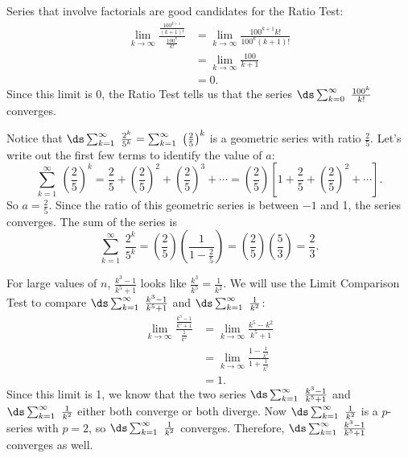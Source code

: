 \begin{activitySolution}
\item Series that involve factorials are good candidates for the Ratio Test:
\begin{align*}
\lim_{k \to \infty} \frac{\frac{100^{k+1}}{(k+1)!}}{\frac{100^k}{k!}} &= \lim_{k \to \infty} \frac{100^{k+1}k!}{100^k(k+1)!} \\
    &= \lim_{k \to \infty} \frac{100}{k+1} \\
    &= 0.
\end{align*}
Since this limit is 0, the Ratio Test tells us that the series $\ds \sum_{k=0}^{\infty} \ \frac{100^k}{k!}$ converges.

\item Notice that $\ds \sum_{k=1}^{\infty} \ \frac{2^k}{5^k} = \sum_{k=1}^{\infty} \ \left(\frac{2}{5}\right)^k$ is a geometric series with ratio $\frac{2}{5}$. Let's write out the first few terms to identify the value of $a$:
\[ \sum_{k=1}^{\infty} \ \left(\frac{2}{5}\right)^k = \frac{2}{5} + \left(\frac{2}{5}\right)^2 + \left(\frac{2}{5}\right)^3 + \cdots = \left(\frac{2}{5}\right)\left[ 1 + \frac{2}{5} + \left(\frac{2}{5}\right)^2 + \cdots \right].\]
So $a = \frac{2}{5}$. Since the ratio of this geometric series is between $-1$ and 1, the series converges. The sum of the series is
\[ \sum_{k=1}^{\infty} \ \frac{2^k}{5^k} = \left(\frac{2}{5}\right) \left(\frac{1}{1-\frac{2}{5}} \right) = \left(\frac{2}{5}\right)\left(\frac{5}{3}\right) = \frac{2}{3}.\]

\item For large values of $n$, $\frac{k^3-1}{k^5+1}$ looks like $\frac{k^3}{k^5}=\frac{1}{k^2}$. We will use the Limit Comparison Test to compare $\ds \sum_{k=1}^{\infty} \ \frac{k^3-1}{k^5+1}$ and $\ds \sum_{k=1}^{\infty} \ \frac{1}{k^2}$:
\begin{align*}
\lim_{k \to \infty} \frac{\frac{k^3-1}{k^5+1}}{\frac{1}{k^2}} &= \lim_{k \to \infty} \frac{k^5-k^2}{k^5+1} \\
    &= \lim_{k \to \infty} \frac{1-\frac{1}{k^3}}{1+\frac{1}{k^5}} \\
    &= 1.
\end{align*}
Since this limit is 1, we know that the two series $\ds \sum_{k=1}^{\infty} \ \frac{k^3-1}{k^5+1}$ and $\ds \sum_{k=1}^{\infty} \ \frac{1}{k^2}$ either both converge or both diverge. Now $\ds \sum_{k=1}^{\infty} \ \frac{1}{k^2}$ is a $p$-series with $p=2$, so $\ds \sum_{k=1}^{\infty} \ \frac{1}{k^2}$ converges. Therefore, $\ds \sum_{k=1}^{\infty} \ \frac{k^3-1}{k^5+1}$ converges as well.


\end{activitySolution}
